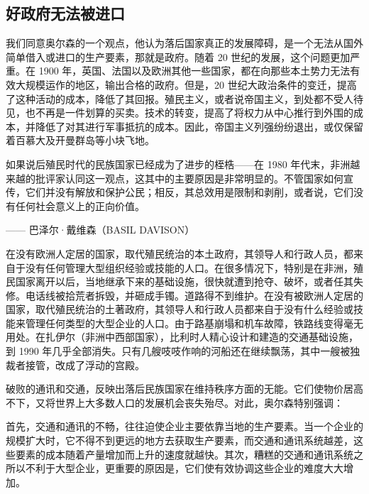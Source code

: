 \subsection{好政府无法被进口}
我们同意奥尔森的一个观点，他认为落后国家真正的发展障碍，是一个无法从国外简单借入或进口的生产要素，那就是政府。随着 20 世纪的发展，这个问题更加严重。在 1900 年，英国、法国以及欧洲其他一些国家，都在向那些本土势力无法有效大规模运作的地区，输出合格的政府。但是，20 世纪大政治条件的变迁，提高了这种活动的成本，降低了其回报。殖民主义，或者说帝国主义，到处都不受人待见，也不再是一件划算的买卖。技术的转变，提高了将权力从中心推行到外围的成本，并降低了对其进行军事抵抗的成本。因此，帝国主义列强纷纷退出，或仅保留着百慕大及开曼群岛等小块飞地。

\begin{tcolorbox}
\kaishu 如果说后殖民时代的民族国家已经成为了进步的桎梏——在 1980 年代末，非洲越来越的批评家认同这一观点，这其中的主要原因是非常明显的。不管国家如何宣传，它们并没有解放和保护公民；相反，其总效用是限制和剥削，或者说，它们没有任何社会意义上的正向价值。
\begin{flushright}
—— 巴泽尔·戴维森（BASIL DAVISON）    
\end{flushright}
\end{tcolorbox}

在没有欧洲人定居的国家，取代殖民统治的本土政府，其领导人和行政人员，都来自于没有任何管理大型组织经验或技能的人口。在很多情况下，特别是在非洲，殖民国家离开以后，当地继承下来的基础设施，很快就遭到抢夺、破坏，或者任其失修。电话线被拾荒者拆毁，并砸成手镯。道路得不到维护。在没有被欧洲人定居的国家，取代殖民统治的土著政府，其领导人和行政人员都来自于没有什么经验或技能来管理任何类型的大型企业的人口。由于路基崩塌和机车故障，铁路线变得毫无用处。在扎伊尔（非洲中西部国家），比利时人精心设计和建造的交通基础设施，到 1990 年几乎全部消失。只有几艘吱吱作响的河船还在继续飘荡，其中一艘被独裁者接管，改成了浮动的宫殿。

破败的通讯和交通，反映出落后民族国家在维持秩序方面的无能。它们使物价居高不下，又将世界上大多数人口的发展机会丧失殆尽。对此，奥尔森特别强调：


\begin{tcolorbox}
\kaishu 首先，交通和通讯的不畅，往往迫使企业主要依靠当地的生产要素。当一个企业的规模扩大时，它不得不到更远的地方去获取生产要素，而交通和通讯系统越差，这些要素的成本随着产量增加而上升的速度就越快。其次，糟糕的交通和通讯系统之所以不利于大型企业，更重要的原因是，它们使有效协调这些企业的难度大大增加。 
\end{tcolorbox}

